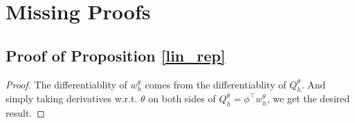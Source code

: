 \documentclass{article}
\numberwithin{equation}{section}
\begin{document}

\section{Missing Proofs}
\label{missing_proof}
\subsection{Proof of Proposition \ref{lin_rep}}
\begin{proof}
The differentiablity of $w_h^\theta$ comes from the differentiablity of $Q_h^\theta$. And simply taking derivatives w.r.t. $\theta$ on both sides of $Q_h^\theta=\phi^\top w_h^\theta$, we get the desired result. 
\end{proof}
\end{document}
